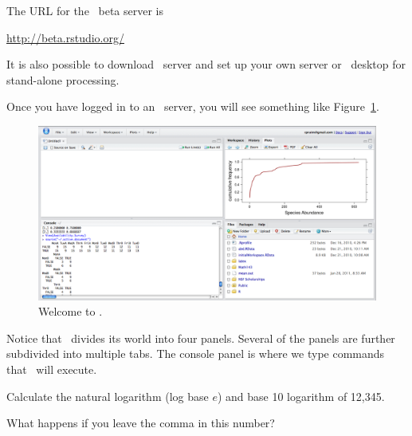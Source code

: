 The URL for the \RStudio\ beta server is
\begin{center}
\url{http://beta.rstudio.org/}
\end{center}

It is also possible to download \RStudio\ server and set up your own server or \RStudio\ desktop
for stand-alone processing.


Once you have logged in to an \RStudio\ server, you will see something like Figure~\ref{fig:Rstudio-bigview}.

\begin{figure}
\begin{center}
\includegraphics[width=1.0\textwidth]{images/RStudio-bigview}
\end{center}
\caption{Welcome to \Rstudio.}
\label{fig:Rstudio-bigview}%
\end{figure}

Notice that \Rstudio\ divides its world into four panels.  Several of the panels
are further subdivided into multiple tabs.
The console panel is where we type commands that \R\ will execute. 

\begin{problem}
Calculate the natural logarithm (log base $e$) and base 10 logarithm of 12,345.

What happens if you leave the comma in this number?
\begin{knitrout}
\end{knitrout}

\end{problem}

